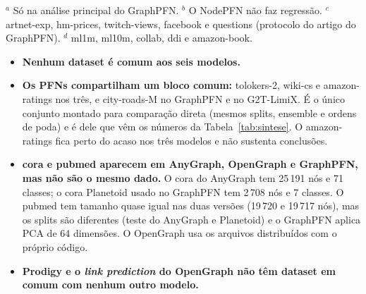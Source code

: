 \documentclass[12pt,a4paper]{article}
\begin{document}
\begin{table}[H]
\centering
\caption{Datasets usados em cada modelo. ``Plan.'' = versão Planetoid; ``própria'' = versão distribuída com o código do modelo.}
\label{tab:sobreposicao}
\end{table}

\noindent $^a$ Só na análise principal do GraphPFN. $^b$ O NodePFN não faz regressão. $^c$ artnet-exp, hm-prices, twitch-views, facebook e questions (protocolo do artigo do GraphPFN). $^d$ ml1m, ml10m, collab, ddi e amazon-book.

\begin{itemize}
  \item \textbf{Nenhum dataset é comum aos seis modelos.}
  \item \textbf{Os PFNs compartilham um bloco comum:} tolokers-2, wiki-cs e amazon-ratings nos três, e city-roads-M no GraphPFN e no G2T-LimiX. É o único conjunto montado para comparação direta (mesmos splits, ensemble e ordens de poda) e é dele que vêm os números da Tabela~\ref{tab:sintese}. O amazon-ratings fica perto do acaso nos três modelos e não sustenta conclusões.
  \item \textbf{cora e pubmed aparecem em AnyGraph, OpenGraph e GraphPFN, mas não são o mesmo dado.} O cora do AnyGraph tem 25\,191 nós e 71 classes; o cora Planetoid usado no GraphPFN tem 2\,708 nós e 7 classes. O pubmed tem tamanho quase igual nas duas versões (19\,720 e 19\,717 nós), mas os splits são diferentes (teste do AnyGraph e Planetoid) e o GraphPFN aplica PCA de 64 dimensões. O OpenGraph usa os arquivos distribuídos com o próprio código.
  \item \textbf{Prodigy e o \emph{link prediction} do OpenGraph não têm dataset em comum com nenhum outro modelo.}
\end{itemize}
\end{document}
